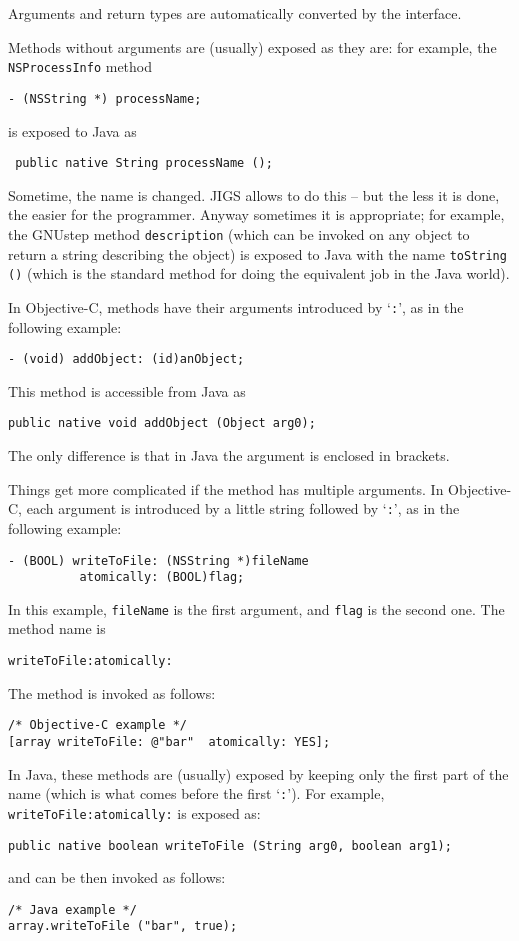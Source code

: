 Arguments and return types are automatically converted by the interface.

Methods without arguments are (usually) exposed as they are: for example, 
the \texttt{NSProcessInfo} method
\begin{verbatim}
- (NSString *) processName;
\end{verbatim}
is exposed to Java as 
\begin{verbatim}
 public native String processName ();
\end{verbatim}

Sometime, the name is changed.  JIGS allows to do this -- but the less
it is done, the easier for the programmer.  Anyway sometimes it is
appropriate; for example, the GNUstep method \texttt{description}
(which can be invoked on any object to return a string describing the
object) is exposed to Java with the name \texttt{toString ()} (which
is the standard method for doing the equivalent job in the Java
world).  

In Objective-C, methods have their arguments introduced by
`\texttt{:}', as in the following example:
\begin{verbatim}
- (void) addObject: (id)anObject;
\end{verbatim}
This method is accessible from Java as
\begin{verbatim}
public native void addObject (Object arg0);
\end{verbatim}
The only difference is that in Java the argument is enclosed in 
brackets.

Things get more complicated if the method has multiple arguments.  In
Objective-C, each argument is introduced by a little string followed
by `\texttt{:}', as in the following example:
\begin{verbatim}
- (BOOL) writeToFile: (NSString *)fileName  
          atomically: (BOOL)flag;
\end{verbatim}
In this example, \texttt{fileName} is the first argument, and
\texttt{flag} is the second one.  The method name is 
\begin{verbatim}
writeToFile:atomically:
\end{verbatim}
The method is invoked as follows:
\begin{verbatim}
/* Objective-C example */
[array writeToFile: @"bar"  atomically: YES];
\end{verbatim}

In Java, these methods are (usually) exposed by keeping only the first
part of the name (which is what comes before the first `\texttt{:}').
For example, \texttt{writeToFile:atomically:} is exposed as:
\begin{verbatim} 
public native boolean writeToFile (String arg0, boolean arg1);
\end{verbatim}
and can be then invoked as follows:
\begin{verbatim}
/* Java example */
array.writeToFile ("bar", true);
\end{verbatim}

